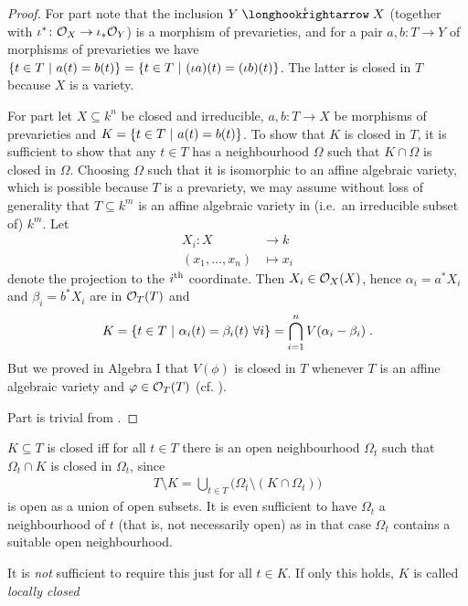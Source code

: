 \documentclass[a4paper,parskip=half,numbers=enddot, DIV=12]{scrreprt}
\begin{document}
\begin{proof}
		For part  note that the inclusion $Y\monomorphism[\iota] X$ (together with $\iota^*\colon \mathcal{O}_X\to\iota_*\mathcal{O}_Y$) is a morphism of prevarieties, and for a pair $a,b\colon T\to Y$ of morphisms of prevarieties we have $\left\{t\in T\ \middle|\  a(t) = b(t) \right\} = \left\{t \in T\ \middle|\ (\iota a)(t) = (\iota b)(t) \right\}$. The latter is closed in $T$ because $X$ is a variety.
	
        For part  let $X\subseteq k^n$ be closed and irreducible, $a,b\colon T\to X$ be morphisms of prevarieties and $K= \left\{t\in T\ \middle|\  a(t) = b(t)\right\}$. To show that $K$ is closed in $T$, it is sufficient to show that any $t\in T$ has a neighbourhood $\Omega$ such that $K\cap \Omega$ is closed in $\Omega$. Choosing $\Omega$ such that it is isomorphic to an affine algebraic variety, which is possible because $T$ is a prevariety, we may assume without loss of generality that $T\subseteq k^m$ is an affine algebraic variety in (i.e.\  an irreducible subset of) $k^m$. Let 
	        \begin{align*}
		    X_i\colon X&\longrightarrow k\\
		    (x_1,\ldots,x_n)&\longmapsto x_i
		\end{align*}
		denote the projection to the $i^{\text{th}}$ coordinate. Then $X_i\in\mathcal{O}_X(X)$, hence $\alpha_i = a^\ast X_i$ and $\beta_i = b^\ast X_i$ are in $\mathcal{O}_T(T)$ and 
		\begin{align}
		    K= \left\{ t\in T\ \middle|\  \alpha_i(t) = \beta_i(t)\ \forall i\right\} = \bigcap_{i=1}^n V(\alpha_i-\beta_i)\;.
		\end{align}
		But we proved in Algebra I that $V(\phi)$ is closed in $T$ whenever $T$ is an affine algebraic variety and $\varphi\in  \mathcal{O}_T(T)$ (cf. \cite[Proposition 2.2.1]{alg1}).
		
		Part  is trivial from .	
\end{proof}
\begin{rem}
    \begin{alphanumerate}
    \item {}
        $K\subseteq T$ is closed iff for all $t\in T$ there is an open neighbourhood $\Omega_t$ such that $\Omega_t\cap K$ is closed in $\Omega_t$, since 
        \begin{align*}
            T\setminus K = \bigcup_{t\in T} \big(\Omega_t\setminus (K\cap \Omega_t)\big)
        \end{align*}
        is open as a union of open subsets. It is even sufficient to have $\Omega_t$ a neighbourhood of $t$ (that is, not necessarily open) as in that case $\Omega_t$ contains a suitable open neighbourhood.
    \item
        It is \emph{not} sufficient to require this just for all $t\in K$. If only this holds, $K$ is called \emph{locally closed}
    \end{alphanumerate}
\end{rem}
\end{document}
